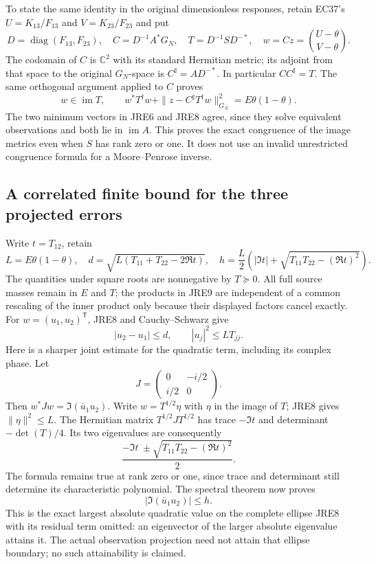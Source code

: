 \documentclass[11pt,a4paper]{article}
\begin{document}
To state the same identity in the original dimensionless responses,
retain EC37's $U=K_{13}/F_{13}$ and $V=K_{23}/F_{23}$ and put
\[
 D=\operatorname{diag}(F_{13},F_{23}),\quad
 C=D^{-1}A^*G_N,\quad T=D^{-1}S D^{-*},\quad
 w=Cz=\binom{U-\theta}{V-\theta}.                              \tag{JRE7}
\]
The codomain of $C$ is $\mathbb C^2$ with its standard Hermitian
metric; its adjoint from that space to the original $G_N$-space is
$C^\sharp=AD^{-*}$. In particular $CC^\sharp=T$.
The same orthogonal argument applied to $C$ proves
\[
 w\in\operatorname{im}T,\qquad
 w^*T^\dagger w+\|z-C^\sharp T^\dagger w\|_{G_N}^{2}
             =E\theta(1-\theta).                              \tag{JRE8}
\]
The two minimum vectors in JRE6 and JRE8 agree, since they solve
equivalent observations and both lie in $\operatorname{im}A$.
This proves the exact congruence of the image metrics even when
$S$ has rank zero or one. It does not use an invalid unrestricted
congruence formula for a Moore--Penrose inverse.

\subsection{A correlated finite bound for the three projected errors}
Write $t=T_{12}$, retain
\[
 L=E\theta(1-\theta),\quad
 d=\sqrt{L(T_{11}+T_{22}-2\Re t)},\quad
 h=\frac L2\left(|\Im t|+
                   \sqrt{T_{11}T_{22}-(\Re t)^2}\right).       \tag{JRE9}
\]
The quantities under square roots are nonnegative by $T\succeq0$.
All full source masses remain in $E$ and $T$; the products in JRE9
are independent of a common rescaling of the inner product only
because their displayed factors cancel exactly.
For $w=(u_1,u_2)^\mathsf T$, JRE8 and Cauchy--Schwarz give
\[
 |u_2-u_1|\le d,\qquad
 |u_j|^2\le L T_{jj}.                                        \tag{JRE10}
\]
Here is a sharper joint estimate for the quadratic term, including
its complex phase. Let
\[
 J=\begin{pmatrix}0&-i/2\\i/2&0\end{pmatrix}.
\]
Then $w^*Jw=\Im(\bar u_1u_2)$.
Write $w=T^{1/2}\eta$ with $\eta$ in the image of $T$;
JRE8 gives $\|\eta\|^2\le L$. The Hermitian matrix
$T^{1/2}JT^{1/2}$ has trace $-\Im t$ and determinant
$-\det(T)/4$. Its two eigenvalues are consequently
\[
 \frac{-\Im t\ \pm\sqrt{T_{11}T_{22}-(\Re t)^2}}2 .           \tag{JRE11}
\]
The formula remains true at rank zero or one, since trace and
determinant still determine its characteristic polynomial.
The spectral theorem now proves
\[
 |\Im(\bar u_1u_2)|\le h.                                   \tag{JRE12}
\]
This is the exact largest absolute quadratic value on the complete
ellipse JRE8 with its residual term omitted: an eigenvector of the
larger absolute eigenvalue attains it. The actual observation projection
need not attain that ellipse boundary; no such attainability is claimed.
\end{document}
